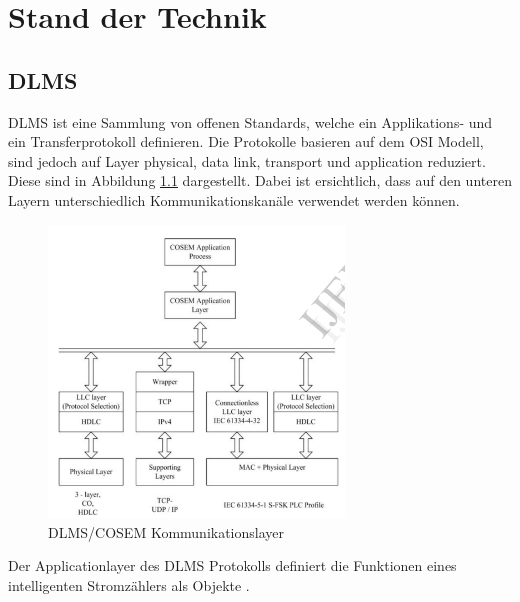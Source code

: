 \chapter{Stand der Technik}




\section{DLMS}
\ac{DLMS} ist eine Sammlung von offenen Standards, welche ein Applikations- und ein Transferprotokoll definieren.
Die Protokolle basieren auf dem \ac{OSI} Modell, sind jedoch auf Layer physical, data link, transport und application reduziert.
Diese sind in Abbildung \ref{fig:dlmsOsi} dargestellt.
Dabei ist ersichtlich, dass auf den unteren Layern unterschiedlich Kommunikationskanäle verwendet werden können.

\begin{figure}[H]
   \centering
   \includegraphics[width=0.7\textwidth]{gfx/Dlms_osi.png}
   \caption{
       DLMS/COSEM Kommunikationslayer
   }
   \label{fig:dlmsOsi}
\end{figure}

Der Applicationlayer des \ac{DLMS} Protokolls definiert die Funktionen eines intelligenten Stromzählers als Objekte \parencite{vyas2012advance}.

